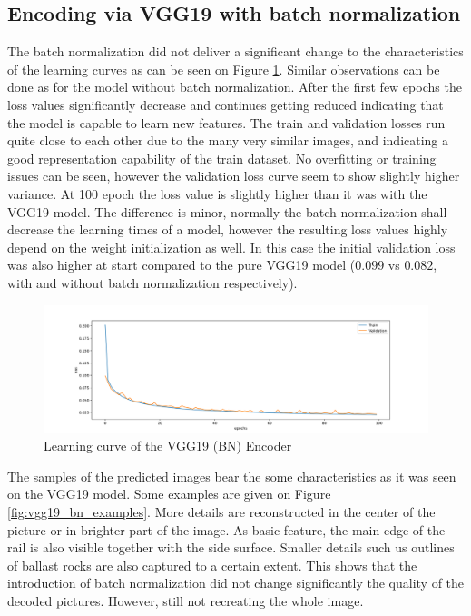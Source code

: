\subsection{Encoding via VGG19 with batch normalization}
The batch normalization did not deliver a significant change to the characteristics of the learning
curves as can be seen on Figure \ref{fig:vgg19_bn_learning_curve}.
Similar observations can be done as for the model without batch normalization.
After the first few epochs the loss values significantly decrease and continues getting reduced
indicating that the model is capable to learn new features.
The train and validation losses run quite close to each other due to the many very similar images,
and indicating a good representation capability of the train dataset.
No overfitting or training issues can be seen, however the validation loss curve seem to show
slightly higher variance.
At 100 epoch the loss value is slightly higher than it was with the VGG19 model.
The difference is minor, normally the batch normalization shall decrease the learning times of a model,
however the resulting loss values highly depend on the weight initialization as well.
In this case the initial validation loss was also higher at start compared to the pure VGG19 model
($0.099$ vs $0.082$, with and without batch normalization respectively).

\begin{figure}[!ht]
    \centering
    \includegraphics[width=\textwidth,trim={0 0 0 1cm},clip]{./results/vgg19_bn_vgg19/20230525_045131_results.png}
    \caption{Learning curve of the VGG19 (BN) Encoder}
    \label{fig:vgg19_bn_learning_curve}
\end{figure}

The samples of the predicted images bear the some characteristics as it was seen on the VGG19 model.
Some examples are given on Figure \ref{fig:vgg19_bn_examples}.
More details are reconstructed in the center of the picture or in brighter part of the image.
As basic feature, the main edge of the rail is also visible together with the side surface.
Smaller details such us outlines of ballast rocks are also captured to a certain extent.
This shows that the introduction of batch normalization did not change significantly the quality of
the decoded pictures.
However, still not recreating the whole image.

